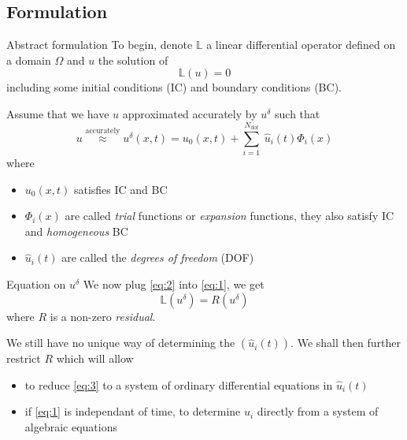 \subsection{Formulation}
\label{sec:formulation}

\begin{frame}{Abstract formulation}
  To begin, denote $\mathbb{L}$ a linear differential operator defined on a domain $\Omega$ and $u$ the solution of
  \begin{equation}
    \label{eq:1}
    \mathbb{L} (u) = 0
  \end{equation}
  including some initial conditions (IC) and boundary conditions (BC).

  Assume that we have $u$ approximated accurately by $u^\delta$ such that
  \begin{equation}
    \label{eq:2}
    u \stackrel{\text{accurately}}{\approx}  u^{\delta }(x, t ) = u_0(x,t) + \sum_{i=1}^{N_{\text{dof}}}\ \hat{u}_i(t) \Phi_i(x)
  \end{equation}
  where
  \begin{itemize}
  \item $u_0(x,t)$ satisfies IC and BC
  \item $\Phi_i(x)$ are called \emph{trial} functions or \emph{expansion} functions, they also  satisfy IC and \emph{homogeneous} BC
  \item $\hat{u}_i(t)$ are called the \emph{degrees of freedom} (DOF)
  \end{itemize}
\end{frame}

\begin{frame}{Equation on $u^\delta$}
  We now plug \eqref{eq:2} into \eqref{eq:1}, we get
  \begin{equation}
    \label{eq:3}
    \mathbb{L}(u^{\delta}) = R( u^{\delta} )
  \end{equation}
  where $R$ is a non-zero \emph{residual}.

  We still have no unique way of determining the $(\hat{u}_i(t))$. We
  shall then further restrict $R$ which will allow
  \begin{itemize}
  \item to reduce \eqref{eq:3} to a system of ordinary differential equations in $\hat{u}_i(t)$
  \item if \eqref{eq:1} is independant of time, to determine $\hat{u}_i$ directly from a system of algebraic equations
  \end{itemize}
\end{frame}

